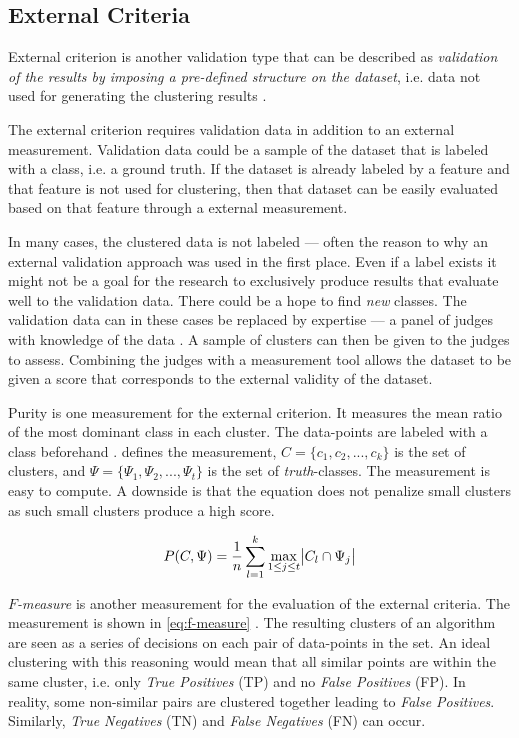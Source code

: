 \documentclass[../report.tex]{subfiles}
\begin{document}
\subsection{External Criteria}
External criterion is another validation type that can be described as \textit{validation of the results by imposing a pre-defined structure on the dataset}, i.e. data not used for generating the clustering results \cite{Halkidi2002}.

The external criterion requires validation data in addition to an external measurement. Validation data could be a sample of the dataset that is labeled with a class, i.e. a ground truth. If the dataset is already labeled by a feature and that feature is not used for clustering, then that dataset can be easily evaluated based on that feature through a external measurement.

In many cases, the clustered data is not labeled --- often the reason to why an external validation approach was used in the first place. Even if a label exists it might not be a goal for the research to exclusively produce results that evaluate well to the validation data. There could be a hope to find \textit{new} classes. The validation data can in these cases be replaced by expertise --- a panel of judges with knowledge of the data \cite{manning2010introduction}. A sample of clusters can then be given to the judges to assess. Combining the judges with a measurement tool allows the dataset to be given a score that corresponds to the external validity of the dataset.

Purity is one measurement for the external criterion. It measures the mean ratio of the most dominant class in each cluster. The data-points are labeled with a class beforehand \cite{manning2010introduction}.  defines the measurement, $C = \{c_1,c_2,...,c_k\}$ is the set of clusters, and $\Psi = \{\Psi_1,\Psi_2,...,\Psi_t \}$ is the set of \textit{truth}-classes. The measurement is easy to compute. A downside is that the equation does not penalize small clusters as such small clusters produce a high score.

\begin{equation}
  \label{eq:purity}
  P(C, \Psi) = \frac{1}{n}\sum^{k}_{l=1}\max_{1 \leq j \leq t}\abs{C_l \cap \Psi_j}
\end{equation}

\textit{$F$-measure} is another measurement for the evaluation of the external criteria. The measurement is shown in \cref{eq:f-measure} \cite{manning2010introduction}. The resulting clusters of an algorithm are seen as a series of decisions on each pair of data-points in the set. An ideal clustering with this reasoning would mean that all similar points are within the same cluster, i.e. only \textit{True Positives} (TP) and no \textit{False Positives} (FP). In reality, some non-similar pairs are clustered together leading to \textit{False Positives}. Similarly, \textit{True Negatives} (TN) and \textit{False Negatives} (FN) can occur.
\end{document}

